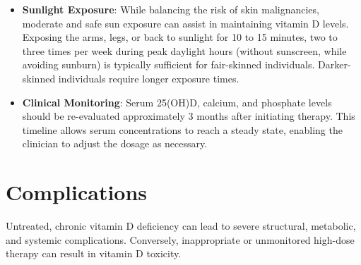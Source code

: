 \begin{itemize}
    \item \textbf{Sunlight Exposure}: While balancing the risk of skin malignancies, moderate and safe sun exposure can assist in maintaining vitamin D levels. Exposing the arms, legs, or back to sunlight for 10 to 15 minutes, two to three times per week during peak daylight hours (without sunscreen, while avoiding sunburn) is typically sufficient for fair-skinned individuals. Darker-skinned individuals require longer exposure times.
    \item \textbf{Clinical Monitoring}: Serum 25(OH)D, calcium, and phosphate levels should be re-evaluated approximately 3 months after initiating therapy. This timeline allows serum concentrations to reach a steady state, enabling the clinician to adjust the dosage as necessary.
\end{itemize}

\section*{Complications}
Untreated, chronic vitamin D deficiency can lead to severe structural, metabolic, and systemic complications. Conversely, inappropriate or unmonitored high-dose therapy can result in vitamin D toxicity.

